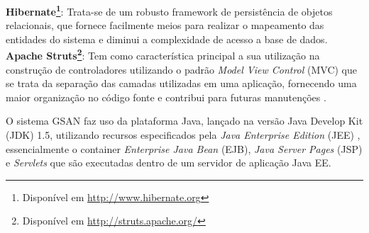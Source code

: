 \textbf{Hibernate\footnote{Disponível em \url{http://www.hibernate.org}}}: Trata-se de um robusto framework de persistência de objetos relacionais, que fornece facilmente meios para realizar o mapeamento das entidades do sistema e diminui a complexidade de acesso a base de dados.\\

\textbf{Apache Struts\footnote{Disponível em \url{http://struts.apache.org/}}}: Tem como característica principal a sua utilização na construção de controladores utilizando o padrão \textit{Model View Control} (MVC) que se trata da separação das camadas utilizadas em uma aplicação, fornecendo uma maior organização no código fonte e contribui para futuras manutenções \cite{fowler2003}. 

O sistema GSAN faz uso da plataforma Java, lançado na versão Java Develop Kit (JDK) 1.5, utilizando recursos especificados pela \textit{Java Enterprise Edition} (JEE) \cite{PORTAL:2014}, essencialmente o container \textit{Enterprise Java Bean} (EJB), \textit{Java Server Pages }(JSP) e \textit{Servlets} que são executadas dentro de um servidor de aplicação Java EE.

